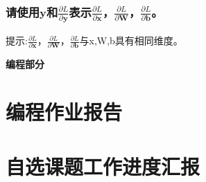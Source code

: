 \documentclass[a4paper]{article}
\begin{document}
\subsubsection{请使用$\mathbf{y}$和$\frac{\partial L}{\partial \mathbf{y}}$表示$\frac{\partial L}{\partial \mathbf{x}}$，$\frac{\partial L}{\partial \mathbf{W}}$，$\frac{\partial L}{\partial \mathbf{b}}$。
}
提示:$\frac{\partial L}{\partial \mathbf{x}}$，$\frac{\partial L}{\partial \mathbf{W}}$，$\frac{\partial L}{\partial \mathbf{b}}$与x,W,b具有相同维度。

\vspace{6mm}
\centerline{\textbf{\Large{编程部分}}}
\vspace{3mm}
\section{编程作业报告}
\section{自选课题工作进度汇报}
\end{document}
